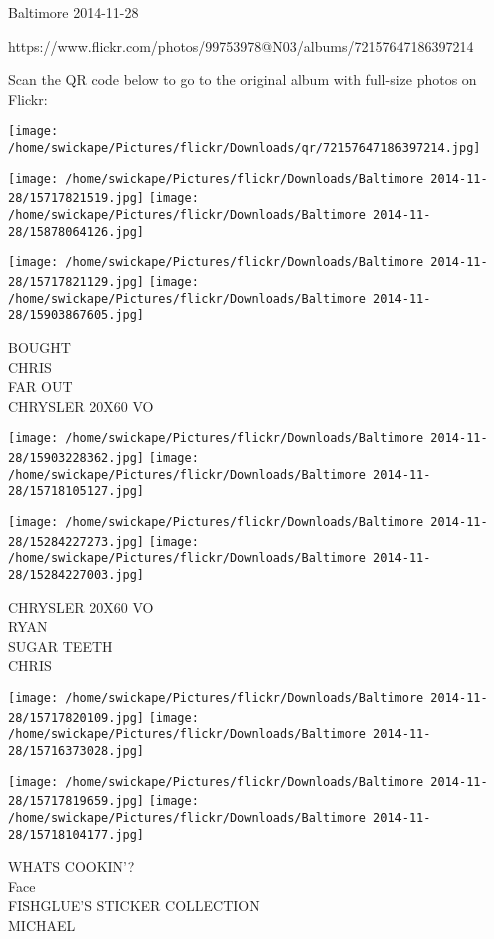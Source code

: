 \documentclass[10pt,letterpaper]{article}
\begin{document}
Baltimore 2014-11-28

https://www.flickr.com/photos/99753978@N03/albums/72157647186397214

Scan the QR code below to go to the original album with full-size photos on Flickr:

\texttt{[image: /home/swickape/Pictures/flickr/Downloads/qr/72157647186397214.jpg]}
\pagebreak

\texttt{[image: /home/swickape/Pictures/flickr/Downloads/Baltimore 2014-11-28/15717821519.jpg]}
\texttt{[image: /home/swickape/Pictures/flickr/Downloads/Baltimore 2014-11-28/15878064126.jpg]}

\texttt{[image: /home/swickape/Pictures/flickr/Downloads/Baltimore 2014-11-28/15717821129.jpg]}
\texttt{[image: /home/swickape/Pictures/flickr/Downloads/Baltimore 2014-11-28/15903867605.jpg]}

BOUGHT\\
CHRIS\\
FAR OUT\\
CHRYSLER 20X60 VO
\pagebreak

\texttt{[image: /home/swickape/Pictures/flickr/Downloads/Baltimore 2014-11-28/15903228362.jpg]}
\texttt{[image: /home/swickape/Pictures/flickr/Downloads/Baltimore 2014-11-28/15718105127.jpg]}

\texttt{[image: /home/swickape/Pictures/flickr/Downloads/Baltimore 2014-11-28/15284227273.jpg]}
\texttt{[image: /home/swickape/Pictures/flickr/Downloads/Baltimore 2014-11-28/15284227003.jpg]}

CHRYSLER 20X60 VO\\
RYAN\\
SUGAR TEETH\\
CHRIS
\pagebreak

\texttt{[image: /home/swickape/Pictures/flickr/Downloads/Baltimore 2014-11-28/15717820109.jpg]}
\texttt{[image: /home/swickape/Pictures/flickr/Downloads/Baltimore 2014-11-28/15716373028.jpg]}

\texttt{[image: /home/swickape/Pictures/flickr/Downloads/Baltimore 2014-11-28/15717819659.jpg]}
\texttt{[image: /home/swickape/Pictures/flickr/Downloads/Baltimore 2014-11-28/15718104177.jpg]}

WHATS COOKIN'?\\
Face\\
FISHGLUE'S STICKER COLLECTION\\
MICHAEL
\pagebreak
\end{document}
